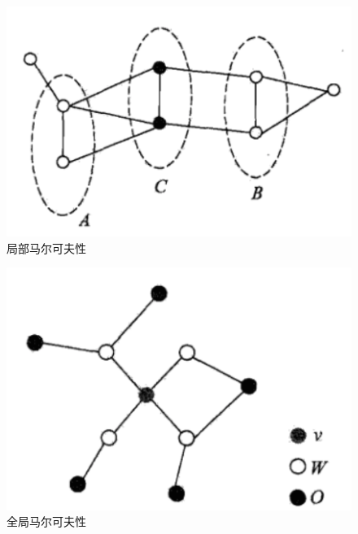 \begin{frame}

	\begin{figure}[htbp]
		\centering
		\includegraphics[scale=0.6]{pic/1-1.png}
		\caption{局部马尔可夫性}
		\label{1-001}
	\end{figure}

\end{frame}

\begin{frame}

	\begin{figure}[htbp]
		\centering
		\includegraphics[scale=0.6]{pic/1-2.png}
		\caption{全局马尔可夫性}
		\label{1-002}
	\end{figure}

\end{frame}

